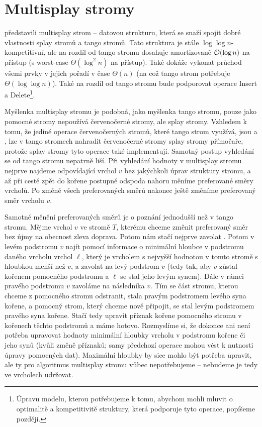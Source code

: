 \section{Multisplay stromy}

\citet{multisplay} představili multisplay strom -- datovou strukturu, která se
snaží spojit dobré vlastnosti splay stromů a tango stromů. Tato struktura je
stále $\log\log n$-kompetitivní, ale na rozdíl od tango stromu dosahuje
amortizovaně $\mathcal O(\log n)$ na přístup (s worst-case $\Theta(\log^2 n)$ na
přístup). Také dokáže vykonat průchod všemi prvky v jejich pořadí v čase
$\Theta(n)$ (na což tango strom potřebuje $\Theta(\log\log n)$). Také na rozdíl
od tango stromu bude podporovat operace Insert a Delete\footnote{Úpravu modelu,
kterou potřebujeme k tomu, abychom mohli mluvit o optimalitě a kompetitivitě
struktury, která podporuje tyto operace, popíšeme později.}.

Myšlenka multisplay stromu je podobná, jako myšlenka tango stromu, pouze jako
pomocné stromy nepoužívá červenočerné stromy, ale splay stromy. Vzhledem k
tomu, že jediné operace červenočerných stromů, které tango strom využívá, jsou
 a , lze v tango stromech nahradit červenočerné stromy
splay stromy přímočaře, protože splay stromy tyto operace také implementují.
Samotný postup vyhledání se od tango stromu nepatrně liší. Při vyhledání
hodnoty v multisplay stromu nejprve najdeme odpovídající vrchol $v$ bez
jakýchkoli úprav struktury stromu, a až při cestě zpět do kořene postupně
odspoda nahoru měníme preferované směry vrcholů. Po změně všech preferovaných
směrů nakonec ještě změníme preferovaný směr vrcholu $v$.

Samotné měnění preferovaných směrů je o poznání jednodušší než v tango stromu.
Mějme vrchol $v$ ve stromě $T$, kterému chceme změnit preferovaný směr bez újmy
na obecnost zleva doprava. Potom nám stačí nejprve zavolat .
Potom v levém podstromu $v$ najít pomocí informace o minimální hloubce v
podstromu daného vrcholu vrchol $\ell$, který je vrcholem s nejvyšší hodnotou v
tomto stromě s hloubkou menší než $v$, a zavolat  na levý
podstrom $v$ (tedy tak, aby $v$ zůstal kořenem pomocného podstromu a $\ell$ se
stal jeho levým synem). Dále v rámci pravého podstromu $v$ zavoláme 
na následníka $v$. Tím se část stromu, kterou chceme z pomocného stromu
odstranit, stala pravým podstromem levého syna kořene, a pomocný strom, který
chceme nově připojit, se stal levým podstromem pravého syna kořene. Stačí tedy
upravit příznak kořene pomocného stromu v kořenech těchto podstromů a máme
hotovo. Rozmyslíme si, že dokonce ani není potřeba upravovat hodnoty minimální
hloubky vrcholu v podstromu kořene či jeho synů (kvůli změně příznaků; samy
předchozí operace  mohou vést k nutnosti úpravy pomocných dat).
Maximální hloubky by sice mohlo být potřeba upravit, ale ty pro algoritmus
multisplay stromu vůbec nepotřebujeme -- nebudeme je tedy ve vrcholech
udržovat.

